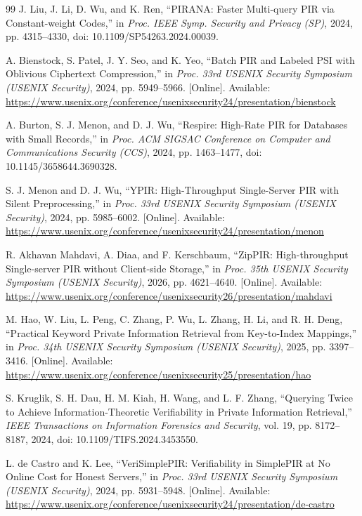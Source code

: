 \begin{thebibliography}{99}
J. Liu, J. Li, D. Wu, and K. Ren, ``PIRANA: Faster Multi-query PIR via Constant-weight Codes,'' in \emph{Proc. IEEE Symp. Security and Privacy (SP)}, 2024, pp. 4315--4330, doi: 10.1109/SP54263.2024.00039.

A. Bienstock, S. Patel, J. Y. Seo, and K. Yeo, ``Batch PIR and Labeled PSI with Oblivious Ciphertext Compression,'' in \emph{Proc. 33rd USENIX Security Symposium (USENIX Security)}, 2024, pp. 5949--5966. [Online]. Available: \url{https://www.usenix.org/conference/usenixsecurity24/presentation/bienstock}

A. Burton, S. J. Menon, and D. J. Wu,
\newblock ``Respire: High-Rate PIR for Databases with Small Records,''
\newblock in \emph{Proc. ACM SIGSAC Conference on Computer and Communications Security (CCS)}, 2024, pp. 1463--1477, doi: 10.1145/3658644.3690328.

S. J. Menon and D. J. Wu, ``YPIR: High-Throughput Single-Server PIR with Silent Preprocessing,'' in \emph{Proc. 33rd USENIX Security Symposium (USENIX Security)}, 2024, pp. 5985--6002. [Online]. Available: \url{https://www.usenix.org/conference/usenixsecurity24/presentation/menon}

R. Akhavan Mahdavi, A. Diaa, and F. Kerschbaum, ``ZipPIR: High-throughput Single-server PIR without Client-side Storage,'' in \emph{Proc. 35th USENIX Security Symposium (USENIX Security)}, 2026, pp. 4621--4640. [Online]. Available: \url{https://www.usenix.org/conference/usenixsecurity26/presentation/mahdavi}

M. Hao, W. Liu, L. Peng, C. Zhang, P. Wu, L. Zhang, H. Li, and R. H. Deng, ``Practical Keyword Private Information Retrieval from Key-to-Index Mappings,'' in \emph{Proc. 34th USENIX Security Symposium (USENIX Security)}, 2025, pp. 3397--3416. [Online]. Available: \url{https://www.usenix.org/conference/usenixsecurity25/presentation/hao}

S. Kruglik, S. H. Dau, H. M. Kiah, H. Wang, and L. F. Zhang,
\newblock ``Querying Twice to Achieve Information-Theoretic Verifiability in Private Information Retrieval,''
\newblock \emph{IEEE Transactions on Information Forensics and Security}, vol. 19, pp. 8172--8187, 2024, doi: 10.1109/TIFS.2024.3453550.

L. de Castro and K. Lee,
\newblock ``VeriSimplePIR: Verifiability in SimplePIR at No Online Cost for Honest Servers,''
\newblock in \emph{Proc. 33rd USENIX Security Symposium (USENIX Security)}, 2024, pp. 5931--5948. [Online]. Available: \url{https://www.usenix.org/conference/usenixsecurity24/presentation/de-castro}


\end{thebibliography}
